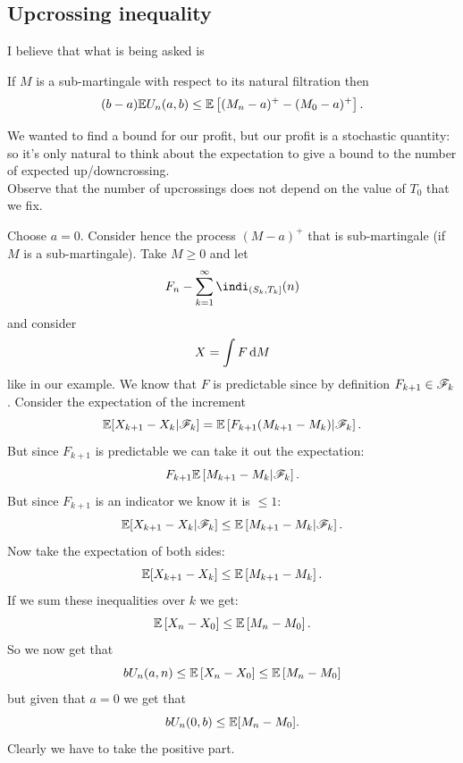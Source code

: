 \documentclass{report}
\begin{document}
\subsection{Upcrossing inequality} 
I believe that what is being asked is
\begin{proposition}
	If $M$ is a sub-martingale with respect to its natural filtration then 
	\begin{equation*}
		(b-a)\mathbb{E} U_{n}(a,b)\leq\mathbb{E}\left[(M_{n}-a)^{+}-(M_{0}-a)^{+}\right].
	\end{equation*}
\end{proposition}
We wanted to find a bound for our profit, but our profit is a stochastic quantity: so it's only natural to think about the expectation to give a bound to the number of expected up/downcrossing.\\
Observe that the number of upcrossings does not depend on the value of $T_0$ that we fix.
\begin{fancyproof}
	Choose $a=0$. Consider hence the process $(M-a)^{+}$ that is sub-martingale (if $M$ is a sub-martingale). Take $M\geq 0$ and let 
	\begin{equation*}
		F_{n}-\sum_{k=1}^{\infty}\indi_{(S_{k},T_{k}]}(n)
	\end{equation*}
	and consider 
	\begin{equation*}
		X=\int F\mathop{}\!\mathrm{d} M
	\end{equation*}
	like in our example. We know that $F$ is predictable since by definition $F_{k+1}\in\mathscr{F}_{k}$. Consider the expectation of the increment
	\begin{equation*}
		\mathbb{E}[X_{k+1}-X_{k}|\mathscr{F}_{k}]=\mathbb{E}\left[F_{k+1}(M_{k+1}-M_{k})|\mathscr{F}_{k}\right].
	\end{equation*}
	But since $F_{k+1}$ is predictable we can take it out the expectation:
	\begin{equation*}
		F_{k+1}\mathbb{E}\left[M_{k+1}-M_{k}|\mathscr{F}_{k}\right].
	\end{equation*}
	But since $F_{k+1}$ is an indicator we know it is $\leq1$:
	\begin{equation*}
		\mathbb{E}[X_{k+1}-X_{k}|\mathscr{F}_{k}]\leq\mathbb{E}\left[M_{k+1}-M_{k}|\mathscr{F}_{k}\right].
	\end{equation*}
	Now take the expectation of both sides:
	\begin{equation*}
		\mathbb{E}[X_{k+1}-X_{k}]\leq\mathbb{E}\left[M_{k+1}-M_{k}\right].
	\end{equation*}
	If we sum these inequalities over $k$ we get:
	\begin{equation*}
		\mathbb{E}\left[X_{n}-X_{0}\right]\leq\mathbb{E}\left[M_{n}-M_{0}\right].
	\end{equation*}
	So we now get that
	\begin{equation*}
		bU_{n}(a,n)\leq\mathbb{E}\left[X_{n}-X_{0}\right]\leq\mathbb{E}\left[M_{n}-M_{0}\right]
	\end{equation*}
	but given that $a=0$ we get that
	\begin{equation*}
		bU_{n}(0,b)\leq\mathbb{E}[M_{n}-M_{0}].
	\end{equation*}
	Clearly we have to take the positive part.
\end{fancyproof}
\end{document}

